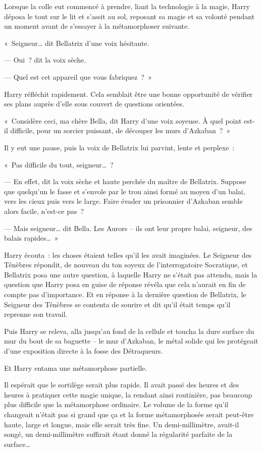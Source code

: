 Lorsque la colle eut commencé à prendre, liant la technologie à la magie, Harry déposa le tout sur le lit et s'assit au sol, reposant sa magie et sa volonté pendant un moment avant de s'essayer à la métamorphoser suivante.

«~Seigneur… dit Bellatrix d'une voix hésitante.

--- Oui~? dit la voix sèche.

--- Quel est cet appareil que vous fabriquez~?~»

Harry réfléchit rapidement. Cela semblait être une bonne opportunité de vérifier ses plans auprès d'elle sous couvert de questions orientées.

«~Considère ceci, ma chère Bella, dit Harry d'une voix soyeuse. À quel point est-il difficile, pour un sorcier puissant, de découper les murs d'Azkaban~?~»

Il y eut une pause, puis la voix de Bellatrix lui parvint, lente et perplexe~:

«~Pas difficile du tout, seigneur…~?

--- En effet, dit la voix sèche et haute perchée du maître de Bellatrix. Suppose que quelqu'un le fasse et s'envole par le trou ainsi formé au moyen d'un balai, vers les cieux puis vers le large. Faire évader un prisonnier d'Azkaban semble alors facile, n'est-ce pas~?

--- Mais seigneur… dit Bella. Les Aurors -- ils ont leur propre balai, seigneur, des balais rapides…~»

Harry écouta~: les choses étaient telles qu'il les avait imaginées. Le Seigneur des Ténèbres répondit, de nouveau du ton soyeux de l'interrogatoire Socratique, et Bellatrix posa une autre question, à laquelle Harry ne s'était pas attendu, mais la question que Harry posa en guise de réponse révéla que cela n'aurait en fin de compte pas d'importance. Et en réponse à la dernière question de Bellatrix, le Seigneur des Ténèbres se contenta de sourire et dit qu'il était temps qu'il reprenne son travail.

Puis Harry se releva, alla jusqu'au fond de la cellule et toucha la dure surface du mur du bout de sa baguette -- le mur d'Azkaban, le métal solide qui les protégeait d'une exposition directe à la fosse des Détraqueurs.

Et Harry entama une métamorphose partielle.

Il espérait que le sortilège serait plus rapide. Il avait passé des heures et des heures à pratiquer cette magie unique, la rendant ainsi routinière, pas beaucoup plus difficile que la métamorphose ordinaire. Le volume de la forme qu'il changeait n'était pas si grand que ça et la forme métamorphosée serait peut-être haute, large et longue, mais elle serait très fine. Un demi-millimètre, avait-il songé, un demi-millimètre suffirait étant donné la régularité parfaite de la surface…


